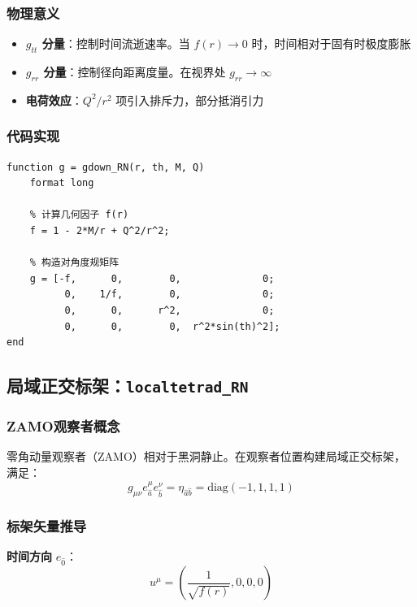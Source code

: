 \documentclass[a4paper,12pt]{article}
\begin{document}
\subsubsection{物理意义}

\begin{itemize}
    \item \textbf{$g_{tt}$ 分量}：控制时间流逝速率。当 $f(r) \to 0$ 时，时间相对于固有时极度膨胀
    \item \textbf{$g_{rr}$ 分量}：控制径向距离度量。在视界处 $g_{rr} \to \infty$
    \item \textbf{电荷效应}：$Q^2/r^2$ 项引入排斥力，部分抵消引力
\end{itemize}

\subsubsection{代码实现}

\begin{lstlisting}[caption={度规函数实现}]
function g = gdown_RN(r, th, M, Q)
    format long
    
    % 计算几何因子 f(r)
    f = 1 - 2*M/r + Q^2/r^2;
    
    % 构造对角度规矩阵
    g = [-f,      0,        0,              0;
          0,    1/f,        0,              0;
          0,      0,      r^2,              0;
          0,      0,        0,  r^2*sin(th)^2];
end
\end{lstlisting}

\subsection{局域正交标架：\texttt{localtetrad\_RN}}

\subsubsection{ZAMO观察者概念}

零角动量观察者（ZAMO）相对于黑洞静止。在观察者位置构建局域正交标架，满足：
\begin{equation}
    g_{\mu\nu} e^\mu_{\hat{a}} e^\nu_{\hat{b}} = \eta_{\hat{a}\hat{b}} = \text{diag}(-1, 1, 1, 1)
\end{equation}

\subsubsection{标架矢量推导}

\textbf{时间方向} $e_{\hat{0}}$：
\begin{equation}
    u^\mu = \left(\frac{1}{\sqrt{f(r)}}, 0, 0, 0\right)
\end{equation}
\end{document}
